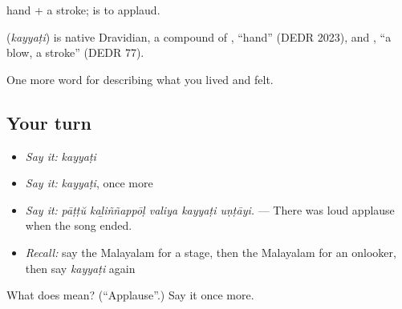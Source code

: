  hand +  a stroke;  is to applaud.

\begin{cousinweb}
\textbf{} (\emph{kayyaṭi}) is native Dravidian, a compound of , \textquotedblleft{}hand\textquotedblright{} (DEDR 2023), and , \textquotedblleft{}a blow, a stroke\textquotedblright{} (DEDR 77).
\end{cousinweb}

\begin{grammarlens}[title={What you've built}]
One more word for describing what you lived and felt.
\end{grammarlens}

\subsection*{Your turn}
\begin{itemize}
\raggedright
  \item \emph{Say it:} \emph{kayyaṭi}
  \item \emph{Say it:} \emph{kayyaṭi}, once more
  \item \emph{Say it:} \emph{pāṭṭŭ kaḻiññappōḷ valiya kayyaṭi uṇṭāyi.} — There was loud applause when the song ended.
  \item \emph{Recall:} say the Malayalam for a stage, then the Malayalam for an onlooker, then say \emph{kayyaṭi} again
\end{itemize}

\begin{tcolorbox}[breakable,colback=teal!4,colframe=teal!35!black,title={Before you move on}]
What does  mean? (\textquotedblleft{}Applause\textquotedblright{}.) Say it once more.
\end{tcolorbox}
